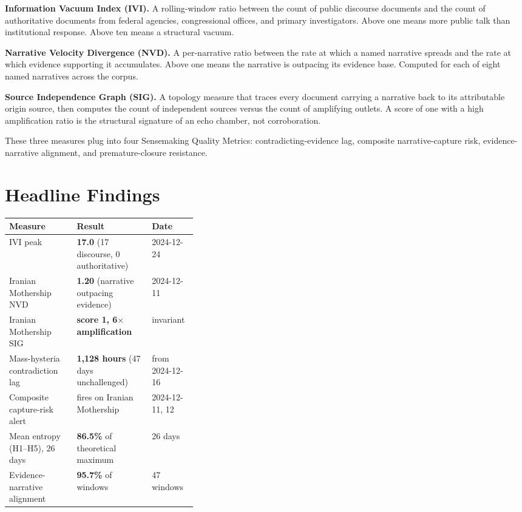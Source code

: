 \documentclass[10pt, letterpaper]{article}
\newcommand{\method}[1]{\textbf{\textcolor{accent}{#1}}}
\begin{document}
\textbf{\method{Information Vacuum Index} (IVI).}
A rolling-window ratio between the count of public discourse documents and the count of authoritative documents from federal agencies, congressional offices, and primary investigators.
Above one means more public talk than institutional response.
Above ten means a structural vacuum.

\textbf{\method{Narrative Velocity Divergence} (NVD).}
A per-narrative ratio between the rate at which a named narrative spreads and the rate at which evidence supporting it accumulates.
Above one means the narrative is outpacing its evidence base.
Computed for each of eight named narratives across the corpus.

\textbf{\method{Source Independence Graph} (SIG).}
A topology measure that traces every document carrying a narrative back to its attributable origin source, then computes the count of independent sources versus the count of amplifying outlets.
A score of one with a high amplification ratio is the structural signature of an echo chamber, not corroboration.

These three measures plug into four Sensemaking Quality Metrics: contradicting-evidence lag, composite narrative-capture risk, evidence-narrative alignment, and premature-closure resistance.

\section{Headline Findings}

\begin{table}[h]
\renewcommand{\arraystretch}{1.15}
\small
\begin{tabular}{@{}p{0.36\linewidth} l l@{}}
  \toprule
  \textbf{Measure} & \textbf{Result} & \textbf{Date} \\
  \midrule
  IVI peak & \textbf{17.0} (17 discourse, 0 authoritative) & 2024-12-24 \\
  Iranian Mothership NVD & \textbf{1.20} (narrative outpacing evidence) & 2024-12-11 \\
  Iranian Mothership SIG & \textbf{score 1, 6$\times$ amplification} & invariant \\
  Mass-hysteria contradiction lag & \textbf{1{,}128 hours} (47 days unchallenged) & from 2024-12-16 \\
  Composite capture-risk alert & fires on Iranian Mothership & 2024-12-11, 12 \\
  Mean entropy (H1--H5), 26 days & \textbf{86.5\%} of theoretical maximum & 26 days \\
  Evidence-narrative alignment & \textbf{95.7\%} of windows & 47 windows \\
  \bottomrule
\end{tabular}
\end{table}
\end{document}
